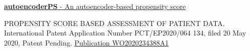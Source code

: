 \documentclass[
	a4paper,
]{fortysecondscv}
\begin{document}
\href{https://github.com/theislab/autoencoderPS}{\textbf{autoencoderPS} - An autoencoder-based propensity score \ExternalLink}

PROPENSITY SCORE BASED ASSESSMENT OF PATIENT DATA. International Patent Application Number PCT/EP2020/064 134, filed 20 May 2020, Patent Pending. \href{https://patents.google.com/patent/WO2020234388A1/en?q=(janick)&inventor=weberpals&oq=weberpals+janick}{Publication WO2020234388A1 \ExternalLink}







\end{document}
